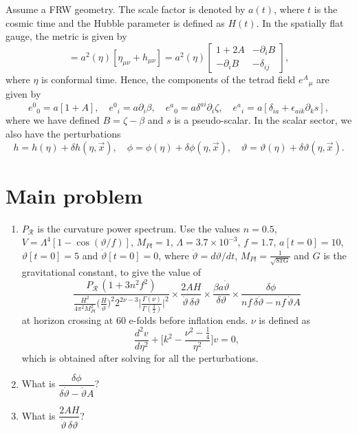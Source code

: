 \documentclass[11pt]{article}
\begin{document}
Assume a FRW geometry. The scale factor is denoted by $a(t)$, where $t$ is the cosmic time and the Hubble parameter is defined as $H(t)$. In the spatially flat gauge, the metric is given by
\begin{equation}
[g_{\mu\nu}]=a^2(\eta)[\eta_{\mu\nu}+h_{\mu\nu}]=a^2(\eta)\begin{bmatrix}1+2A&-\partial_iB\\-\partial_iB&-\delta_{ij}\end{bmatrix},
\end{equation}
where $\eta$ is conformal time. Hence, the components of the tetrad field $e^A{}_\mu$ are given by
\begin{equation}
e^0{}_0=a[1+A],\quad e^0{}_i=a\partial_i\beta,\quad e^a{}_0=a\delta^{ai}\partial_i\zeta,\quad e^a{}_i=a[\delta_{ia}+\epsilon_{aik}\partial_ks],
\end{equation}
where we have defined $B=\zeta-\beta$ and $s$ is a pseudo-scalar. In the scalar sector, we also have the perturbations
\begin{equation}
h=h(\eta)+\delta h(\eta,\vec x),\quad \phi=\phi(\eta)+\delta\phi(\eta,\vec x),\quad \vartheta=\vartheta(\eta)+\delta\vartheta(\eta,\vec x).
\end{equation}

\section*{Main problem}
\begin{enumerate}
\item $P_{\mathcal R}$ is the curvature power spectrum. Use the values $n=0.5$, $V=\Lambda^4[1-\cos(\vartheta/f)]$, $M_{Pl}=1$, $\Lambda=3.7\times10^{-3}$, $f=1.7$, $a[t=0]=10$, $\vartheta[t=0]=5$ and $\dot\vartheta[t=0]=0$, where $\dot\vartheta=d\vartheta/dt$, $M_{Pl}=\frac{1}{\sqrt{8\pi G}}$ and $G$ is the gravitational constant, to give the value of
\begin{equation}
\frac{P_{\mathcal R}\,(1+3n^2f^2)}{\frac{H^2}{4\pi^2M_{Pl}^2}\big(\frac{H}{\dot\vartheta}\big)^2 2^{2\nu-3}\big|\frac{\Gamma(\nu)}{\Gamma(\frac32)}\big|^2}\times\frac{2AH}{\dot\vartheta\,\delta\vartheta}\times\frac{\beta a\dot\vartheta}{\delta\vartheta}\times\frac{\delta\phi}{nf\,\delta\dot\vartheta-nf\,\dot\vartheta A}
\label{eq:E}
\end{equation}
at horizon crossing at 60 e-folds before inflation ends. $\nu$ is defined as
\begin{equation}
\frac{d^2v}{d\eta^2}+\Big[k^2-\frac{\nu^2-\frac14}{\eta^2}\Big]v=0,
\end{equation}
which is obtained after solving for all the perturbations.
\item What is $\dfrac{\delta\phi}{\delta\dot\vartheta-\dot\vartheta A}$?
\item What is $\dfrac{2AH}{\dot\vartheta\,\delta\vartheta}$?
\end{enumerate}
\end{document}
